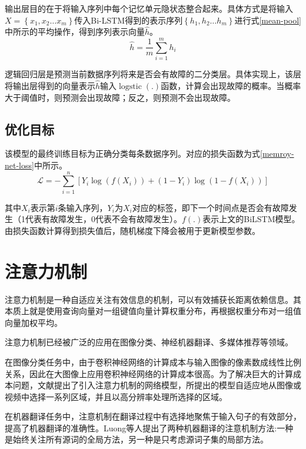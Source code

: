 输出层目的在于将输入序列中每个记忆单元隐状态整合起来。具体方式是将输入$X=\left\{x_{1}, x_{2} \ldots x_{m}\right\}$传入Bi-LSTM得到的表示序列$\left\{h_{1}, h_{2} \ldots h_{m}\right\}$进行式\ref{mean-pool}中所示的平均操作，得到序列表示向量$\widehat{h}$。
\begin{equation}
    \widehat{h}=\frac{1}{m} \sum_{i=1}^{m} h_{i}
    \label{mean-pool}
\end{equation}

逻辑回归层是预测当前数据序列将来是否会有故障的二分类层。具体实现上，该层将输出层得到的向量表示$\widehat{h}$输入$\operatorname{logstic}(.)$函数，计算会出现故障的概率。当概率大于阈值时，则预测会出现故障；反之，则预测不会出现故障。

\subsection{优化目标}
该模型的最终训练目标为正确分类每条数据序列。对应的损失函数为式\ref{memroy-net-loss}中所示。
\begin{equation}
    \mathcal{L}=-\sum_{i=1}^{n}\left[Y_{i} \log \left(f\left(X_{i} \right)\right)+\left(1-Y_{i}\right) \log \left(1-f\left(X_{i} \right)\right)\right]
    \label{memroy-net-loss}
\end{equation}

其中$X_{i}$表示第$i$条输入序列，$Y_{i}$为$X_{i}$对应的标签，即下一个时间点是否会有故障发生（1代表有故障发生，0代表不会有故障发生）。$f\left(.\right)$表示上文的BiLSTM模型。由损失函数计算得到损失值后，随机梯度下降会被用于更新模型参数。

\section{注意力机制}
注意力机制是一种自适应关注有效信息的机制，可以有效捕获长距离依赖信息\cite{mnih2014recurrent}。其本质上就是使用查询向量对一组键值向量计算权重分布，再根据权重分布对一组值向量加权平均。

注意力机制已经被广泛的应用在图像分类\cite{mnih2014recurrent}、神经机器翻译\cite{DBLP:conf/emnlp/LuongPM15}、多媒体推荐\cite{chen2017attentive}等领域。

在图像分类任务中，由于卷积神经网络的计算成本与输入图像的像素数成线性比例关系，因此在大图像上应用卷积神经网络的计算成本很高。为了解决巨大的计算成本问题，文献\parencite{mnih2014recurrent}提出了引入注意力机制的网络模型，所提出的模型自适应地从图像或视频中选择一系列区域，并且以高分辨率处理所选择的区域。

在机器翻译任务中，注意机制在翻译过程中有选择地聚焦于输入句子的有效部分，提高了机器翻译的准确性。Luong等人提出了两种机器翻译的注意机制方法:一种是始终关注所有源词的全局方法，另一种是只考虑源词子集的局部方法\cite{DBLP:conf/emnlp/LuongPM15}。

